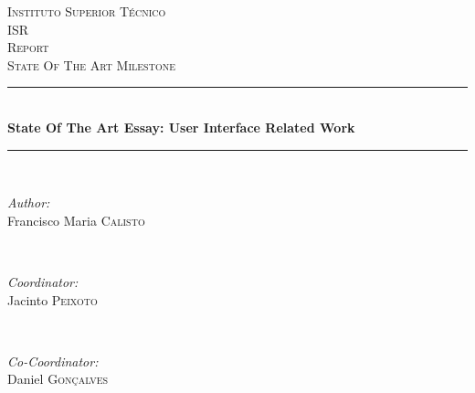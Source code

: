 \begin{titlepage}

\newcommand{\HRule}{\rule{\linewidth}{0.5mm}} %

\center %
 

\textsc{\LARGE Instituto Superior T\'{e}cnico}\\[1.5cm]
\textsc{\Large ISR}\\[0.5cm]
\textsc{\large Report}\\[0.25cm]
\textsc{\small State Of The Art Milestone}\\[0.25cm]


\HRule \\[0.5cm]
{ \large \bfseries State Of The Art Essay: User Interface Related Work}\\[0.25cm] %
\HRule \\[0.5cm]
 

\begin{minipage}{0.4\textwidth}
\begin{flushleft} \large
\emph{Author:}\\
Francisco Maria \textsc{Calisto} %
\end{flushleft}
\end{minipage}
~
\begin{minipage}{0.4\textwidth}
\begin{flushright} \large
\emph{Coordinator:} \\
Jacinto \textsc{Peixoto} %
\end{flushright}
~
\begin{flushright} \large
\emph{Co-Coordinator:} \\
Daniel \textsc{Gon\c{c}alves} %
\end{flushright}
\end{minipage}\\[2cm]


\end{titlepage}
